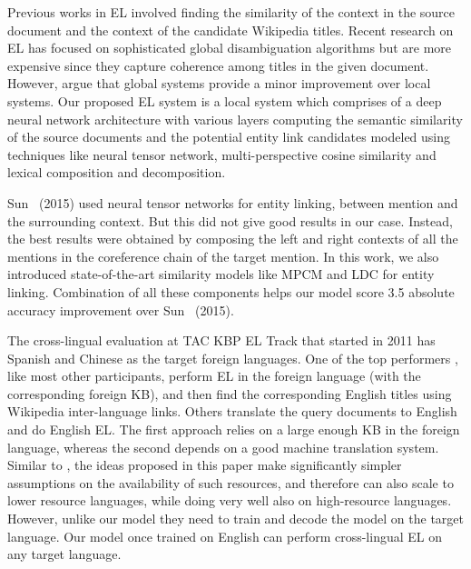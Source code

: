 \documentclass[letterpaper]{article} \usepackage{aaai18}  \usepackage{times}  \usepackage{helvet}  \usepackage{courier}  \usepackage{url}  \usepackage{graphicx}  \frenchspacing  \setlength{\pdfpagewidth}{8.5in}  \setlength{\pdfpageheight}{11in}  \usepackage{latexsym}
\begin{document}
Previous works in EL \cite{2006-eacl-bunescu-wikipedia-ne-disambig,2007-cikm-mihalcea-wikify} involved finding the similarity of the context in the source document and the context of the candidate Wikipedia titles. Recent research
on EL has focused on sophisticated global disambiguation algorithms \cite{globerson2016collective,2008-cikm-milne-witten-wikifier,emnlp-chengroth-2013,cikm-joint-nerel} but are more expensive since they capture coherence among titles in the given document. 
However, \cite{2011-acl-illinois-wikifier} argue that global systems provide a minor improvement over local systems. Our proposed EL system is a local system which comprises of a deep neural network architecture with various layers computing the semantic similarity of the source documents and the potential entity link candidates modeled using techniques like neural tensor network, multi-perspective cosine similarity and lexical composition and decomposition.

Sun \etal\ (2015) used neural tensor networks for entity linking, between mention and the surrounding context. But this did not give good results in our case. Instead, the best results were obtained by composing the left and right contexts of all the mentions in the coreference chain of the target mention. In this work, we also introduced state-of-the-art similarity models like MPCM and LDC for entity linking. Combination of all these components helps our model score 3.5 absolute accuracy improvement over Sun \etal\ (2015).

The cross-lingual evaluation at TAC KBP EL Track that started in 2011 \cite{jioverview2011,ji2015overview} has Spanish and Chinese as the 
target foreign languages. One of the top performers \cite{sil2016one}, like most other participants, perform EL in the foreign language (with the corresponding foreign KB), and then find the corresponding English titles using Wikipedia inter-language links. Others \cite{2011cross} translate the query documents to English and do English EL. The first approach relies on a large enough KB in the foreign language, whereas the second depends on a good machine translation system. Similar to \cite{tsai2016cross}, the ideas proposed in this paper make significantly simpler assumptions on the availability of such resources, and therefore can also scale to lower resource languages, while doing very well also on high-resource languages. However, unlike our model they need to train and decode the model on the target language. Our model once trained on English can perform cross-lingual EL on any target language.
\end{document}
